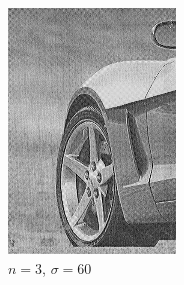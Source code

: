 \documentclass[
	12pt, %
]{style/fphw}
\begin{document}
\begin{figure}[H]
\begin{subfigure}[b]{.22\textwidth}
             \includegraphics[width=\textwidth]{plots2/Q5_3_2_60.png}
             \caption{$n=3$, $\sigma=60$}
             \label{Q5_3_3_60.tif}
         \end{subfigure}
         \hfill
         \begin{subfigure}[b]{.22\textwidth}
             \centering

\end{subfigure}
\end{figure}
\end{document}
